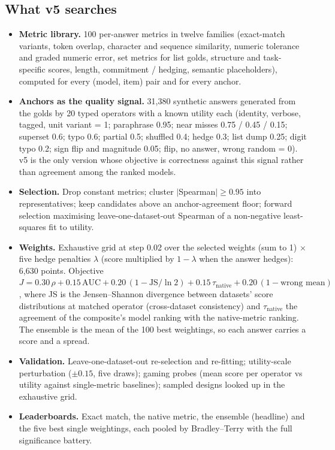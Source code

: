 \documentclass[11pt]{article}
\begin{document}
\subsection{What v5 searches}
\begin{itemize}
\item \textbf{Metric library.} 100 per-answer metrics in twelve families (exact-match variants, token overlap, character and sequence similarity, numeric tolerance and graded numeric error, set metrics for list golds, structure and task-specific scores, length, commitment / hedging, semantic placeholders), computed for every (model, item) pair and for every anchor.
\item \textbf{Anchors as the quality signal.} 31,380 synthetic answers generated from the golds by 20 typed operators with a known utility each (identity, verbose, tagged, unit variant = 1; paraphrase 0.95; near misses 0.75 / 0.45 / 0.15; superset 0.6; typo 0.6; partial 0.5; shuffled 0.4; hedge 0.3; list dump 0.25; digit typo 0.2; sign flip and magnitude 0.05; flip, no answer, wrong random = 0). v5 is the only version whose objective is correctness against this signal rather than agreement among the ranked models.
\item \textbf{Selection.} Drop constant metrics; cluster $|$Spearman$| \ge 0.95$ into representatives; keep candidates above an anchor-agreement floor; forward selection maximising leave-one-dataset-out Spearman of a non-negative least-squares fit to utility.
\item \textbf{Weights.} Exhaustive grid at step 0.02 over the selected weights (sum to 1) $\times$ five hedge penalties $\lambda$ (score multiplied by $1 - \lambda$ when the answer hedges): 6,630 points. Objective $J = 0.30\,\rho + 0.15\,\text{AUC} + 0.20\,(1 - \text{JS}/\ln 2) + 0.15\,\tau_{\text{native}} + 0.20\,(1 - \text{wrong mean})$, where JS is the Jensen--Shannon divergence between datasets' score distributions at matched operator (cross-dataset consistency) and $\tau_{\text{native}}$ the agreement of the composite's model ranking with the native-metric ranking. The ensemble is the mean of the 100 best weightings, so each answer carries a score and a spread.
\item \textbf{Validation.} Leave-one-dataset-out re-selection and re-fitting; utility-scale perturbation ($\pm 0.15$, five draws); gaming probes (mean score per operator vs utility against single-metric baselines); sampled designs looked up in the exhaustive grid.
\item \textbf{Leaderboards.} Exact match, the native metric, the ensemble (headline) and the five best single weightings, each pooled by Bradley--Terry with the full significance battery.
\end{itemize}
\end{document}
